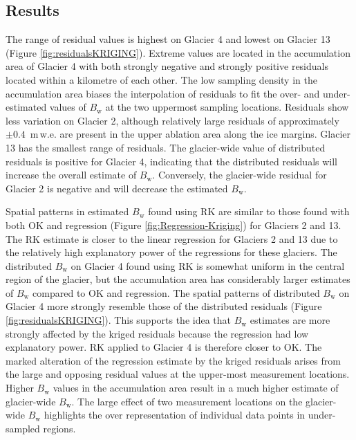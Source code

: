 \documentclass[onecolumn, letterpaper]{igs}
\begin{document}
\subsection{Results}

The range of residual values is highest on Glacier 4 and lowest on Glacier 13 (Figure \ref{fig:residualsKRIGING}). Extreme values are located in the accumulation area of Glacier 4 with both strongly negative and strongly positive residuals located within a kilometre of each other. The low sampling density in the accumulation area biases the interpolation of residuals to fit the over- and under-estimated values of $B_\mathrm{w}$ at the two uppermost sampling locations. Residuals show less variation on Glacier 2, although relatively large residuals of approximately $\pm 0.4$ \,m\,w.e. are present in the upper ablation area along the ice margins. Glacier 13 has the smallest range of residuals. The glacier-wide value of distributed residuals is positive for Glacier 4, indicating that the distributed residuals will increase the overall estimate of $B_\mathrm{w}$. Conversely, the glacier-wide residual for Glacier 2 is negative and will decrease the estimated $B_\mathrm{w}$. 

Spatial patterns in estimated $B_\mathrm{w}$ found using RK are similar to those found with both OK and regression (Figure \ref{fig:Regression-Kriging}) for Glaciers 2 and 13. The RK estimate is closer to the linear regression for Glaciers 2 and 13 due to the relatively high explanatory power of the regressions for these glaciers. The distributed $B_\mathrm{w}$ on Glacier 4 found using RK is somewhat uniform in the central region of the glacier, but the accumulation area has considerably larger estimates of $B_\mathrm{w}$ compared to OK and regression. The spatial patterns of distributed $B_\mathrm{w}$ on Glacier 4 more strongly resemble those of the distributed residuals (Figure \ref{fig:residualsKRIGING}). This supports the idea that $B_\mathrm{w}$ estimates are more strongly affected by the kriged residuals because the regression had low explanatory power. RK applied to Glacier 4 is therefore closer to OK. The marked alteration of the regression estimate by the kriged residuals arises from the large and opposing residual values at the upper-most measurement locations. Higher $B_\mathrm{w}$ values in the accumulation area result in a much higher estimate of glacier-wide $B_\mathrm{w}$. The large effect of two measurement locations on the glacier-wide $B_\mathrm{w}$ highlights the over representation of individual data points in under-sampled regions.
\end{document}
